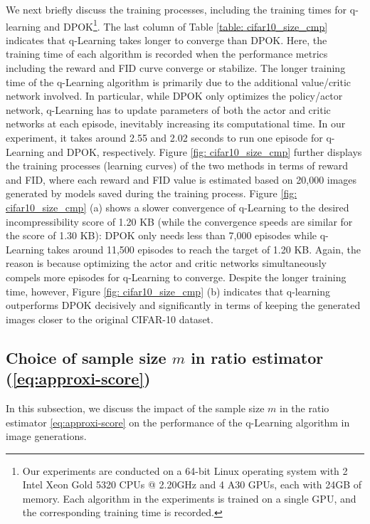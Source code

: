\documentclass[11pt]{article}
\begin{document}
We next briefly discuss the training processes, including the training times for q-learning and DPOK\footnote{Our experiments are conducted on a
64-bit Linux operating system with 2 Intel Xeon Gold 5320 CPUs @ 2.20GHz and 4 A30 GPUs, each with 24GB of memory. Each algorithm in the
experiments is trained on a single GPU, and the corresponding training time is recorded.}. The last column of Table \ref{table: cifar10_size_cmp} indicates that q-Learning takes longer to converge than DPOK. Here, the training time of each algorithm is  recorded when the performance metrics including the reward and FID curve converge or stabilize. The longer training time of the q-Learning algorithm is primarily due to the additional value/critic network involved. In particular, while DPOK only optimizes the policy/actor network, q-Learning has to update parameters of both the actor and critic networks at each episode, inevitably  increasing its computational time. In our experiment, it takes around 2.55 and 2.02 seconds to run one episode for q-Learning and DPOK, respectively.
Figure \ref{fig: cifar10_size_cmp}
 further displays the training processes (learning curves) of the two methods in terms of reward and FID, where each reward and FID value is estimated based on 20,000 images generated by models saved during the training process. Figure \ref{fig: cifar10_size_cmp} (a) shows a slower convergence of q-Learning to the desired incompressibility score of 1.20 KB (while the convergence speeds are similar for the score of 1.30 KB): DPOK only needs less than 7,000 episodes while q-Learning takes around 11,500 episodes to reach the target of 1.20 KB. Again, the reason is because
 optimizing the actor and critic networks simultaneously compels more episodes for  q-Learning to converge.  Despite the longer training time, however, Figure \ref{fig: cifar10_size_cmp} (b) indicates that q-learning outperforms DPOK decisively and significantly in terms of keeping the generated images closer to the original CIFAR-10 dataset.










\subsection{Choice of sample size $m$ in ratio estimator (\ref{eq:approxi-score})} \label{sec:m-effect}
In this subsection, we discuss the impact  of the sample size $m$ in the ratio estimator \eqref{eq:approxi-score} on the performance of the q-Learning algorithm in image generations.
\end{document}
